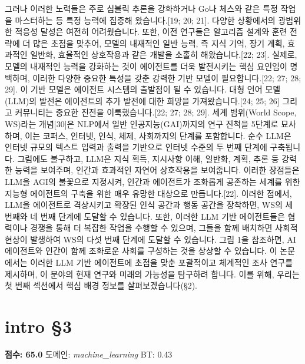 \documentclass[11pt,a4paper,oneside]{memoir}
\begin{document}
\begin{tcolorbox}[kostyle]
그러나 이러한 노력들은 주로 심볼릭 추론을 강화하거나 Go나 체스와 같은 특정 작업을 마스터하는 등 특정 능력에 집중해 왔습니다.[19; 20; 21]. 다양한 상황에서의 광범위한 적응성 달성은 여전히 어려웠습니다. 또한, 이전 연구들은 알고리즘 설계와 훈련 전략에 더 많은 초점을 맞추어, 모델의 내재적인 일반 능력, 즉 지식 기억, 장기 계획, 효과적인 일반화, 효율적인 상호작용과 같은 개발을 소홀히 해왔습니다.[22; 23]. 실제로, 모델의 내재적인 능력을 강화하는 것이 에이전트를 더욱 발전시키는 핵심 요인임이 명백하며, 이러한 다양한 중요한 특성을 갖춘 강력한 기반 모델이 필요합니다.[22; 27; 28; 29]. 이 기반 모델은 에이전트 시스템의 출발점이 될 수 있습니다. 대형 언어 모델(LLM)의 발전은 에이전트의 추가 발전에 대한 희망을 가져왔습니다.[24; 25; 26] 그리고 커뮤니티는 중요한 진전을 이룩했습니다.[22; 27; 28; 29]. 세계 범위(World Scope, WS)라는 개념[30]은 NLP에서 일반 인공지능(GAI)까지의 연구 진척을 5단계로 묘사하며, 이는 코퍼스, 인터넷, 인식, 체제, 사회까지의 단계를 포함합니다. 순수 LLM은 인터넷 규모의 텍스트 입력과 출력을 기반으로 인터넷 수준의 두 번째 단계에 구축됩니다. 그럼에도 불구하고, LLM은 지식 획득, 지시사항 이해, 일반화, 계획, 추론 등 강력한 능력을 보여주며, 인간과 효과적인 자연어 상호작용을 보여줍니다. 이러한 장점들은 LLM을 AGI의 불꽃으로 지정시켜, 인간과 에이전트가 조화롭게 공존하는 세계를 위한 지능형 에이전트의 구축을 위한 매우 유망한 대상으로 만듭니다.[22]. 이러한 점에서, LLM을 에이전트로 격상시키고 확장된 인식 공간과 행동 공간을 장착하면, WS의 세 번째와 네 번째 단계에 도달할 수 있습니다. 또한, 이러한 LLM 기반 에이전트들은 협력이나 경쟁을 통해 더 복잡한 작업을 수행할 수 있으며, 그들을 함께 배치하면 사회적 현상이 발생하여 WS의 다섯 번째 단계에 도달할 수 있습니다. 그림 1을 참조하면, AI 에이전트와 인간이 함께 조화로운 사회를 구성하는 것을 상상할 수 있습니다. 이 논문에서는 이러한 LLM 기반 에이전트에 초점을 맞춘 포괄적이고 체계적인 조사 연구를 제시하며, 이 분야의 현재 연구와 미래의 가능성을 탐구하려 합니다. 이를 위해, 우리는 첫 번째 섹션에서 핵심 배경 정보를 살펴보겠습니다(§2).
\end{tcolorbox}
\vspace{0.8em}

\section{intro §3}
\noindent \textbf{\color{ScoreOrange}점수: 65.0} \quad 도메인: \textit{machine\_learning}  \quad \textcolor{ScoreRed}{BT: 0.43}
\vspace{0.4em}
\end{document}
